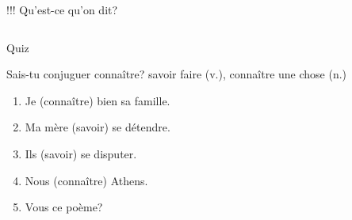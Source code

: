 \documentclass{beamer}
\begin{document}
  \begin{frame}{!!!}
    Qu'est-ce qu'on dit?
    \begin{columns}
        \begin{minipage}[c][0.8\textheight]{\linewidth}
          \begin{center}
          \end{center}
        \end{minipage}
    \end{columns}
  \end{frame}

  \begin{frame}{}
    \begin{center}
      \Large Quiz
    \end{center}
  \end{frame}

  \begin{frame}{Sais-tu conjuguer connaître?}
    savoir \alert{faire} (v.), connaître \alert{une chose} (n.)
    \begin{enumerate}
      \item Je \underline{} (connaître) bien sa famille.
      \item Ma mère \underline{} (savoir) se détendre.
      \item Ils \underline{} (savoir) se disputer.
      \item Nous \underline{} (connaître) Athens.
      \item Vous \underline{} ce poème?
    \end{enumerate}
  \end{frame}
\end{document}
